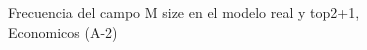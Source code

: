 \begin{figure}[H]
    \centering
    
    \caption{Frecuencia del campo M size en el modelo real y top2+1, Economicos (A-2)}
    \label{frecuency-M Size-top2+1}
\end{figure}